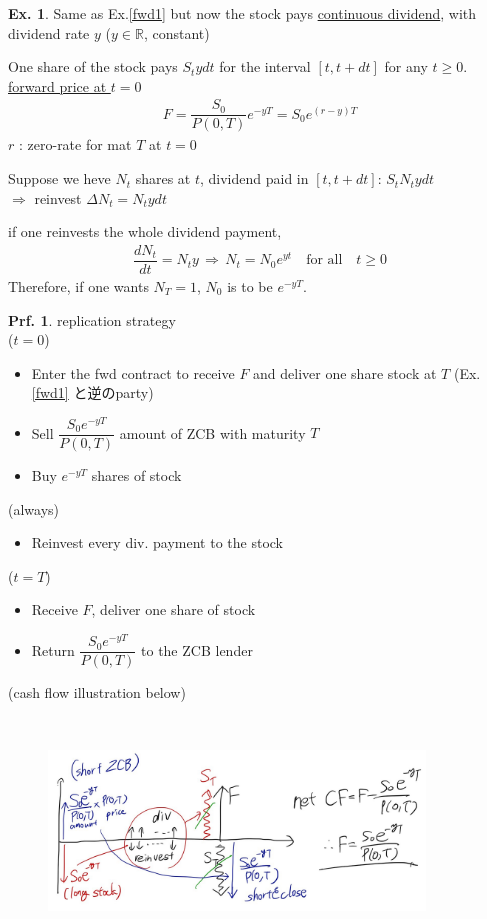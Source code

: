 \documentclass[a4paper,11pt]{jsarticle}
\theoremstyle{definition}
\newtheorem{prf}{Prf.}[subsection]
\newtheorem{ex}{Ex.}[subsection]
\newcommand{\df}[2]{\dfrac{#1}{#2}}
\begin{document}
\begin{ex}
  Same as Ex.\ref{fwd1} but now the stock pays 
  \underline{continuous dividend}, with dividend rate $y$
  ($y\in \mathbb{R}$, constant)

  One share of the stock pays $S_t ydt$ for the interval
  $[t, t+dt]$ for any $t\geq 0$. \\
  \underline{forward price at $t=0$}
  \begin{align}
    F=\df{S_0}{P(0,T)}e^{-yT}=S_0 e^{(r-y)T}
  \end{align}
  $r$ : zero-rate for mat $T$ at $t=0$

  Suppose we heve $N_t$ shares at $t$,
  dividend paid in $[t, t+dt]: \, S_t N_t ydt$ \\
  $\Rightarrow$ reinvest $\Delta N_t = N_t ydt$

  if one reinvests the whole dividend payment, 
  \begin{align}
    \df{dN_t}{dt}=N_t y \, \Rightarrow \,
    N_t=N_0e^{yt} \quad \mbox{for all} \quad t\geq 0
  \end{align}
  Therefore, if one wants $N_T=1$, $N_0$ is to be $e^{-yT}$.

  \begin{prf}{replication strategy} \\
    ($t=0$)
    \begin{itemize}
      \item Enter the fwd contract to receive $F$ and deliver
      one share stock at $T$ (Ex.\ref{fwd1} と逆のparty)
      \item Sell $\df{S_0 e^{-yT}}{P(0,T)}$ amount of ZCB with maturity $T$
      \item Buy $e^{-yT}$ shares of stock
    \end{itemize}
    (always)
    \begin{itemize}
      \item Reinvest every div. payment to the stock
    \end{itemize}    
    ($t=T$)
    \begin{itemize}
      \item Receive $F$, deliver one share of stock
      \item Return $\df{S_0 e^{-yT}}{P(0,T)}$ to the ZCB lender
    \end{itemize}
    (cash flow illustration below)
  \end{prf}
\end{ex}

\begin{figure}[H]　%
  \begin{center}
    \includegraphics[width=10cm]{fig/1_2_02.JPG}
  \end{center}
\end{figure}
\end{document}
